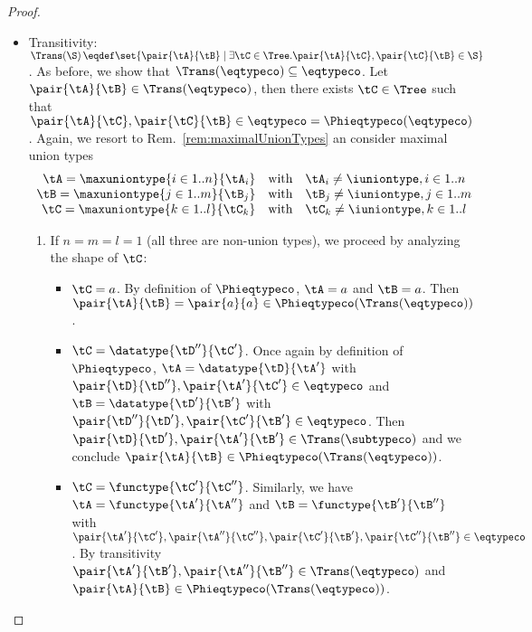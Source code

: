 \begin{proof}
\begin{itemize}
  
  \item Transitivity: $\Trans\!\left(\S\right) \eqdef \set{\pair{\tA}{\tB}
  \mathrel| \exists \tC \in \Tree. \pair{\tA}{\tC}, \pair{\tC}{\tB} \in \S}$.
  As before, we show that $\Trans\!\left(\eqtypeco\right) \subseteq
  \mathbin{\eqtypeco}$. Let $\pair{\tA}{\tB} \in
  \Trans\!\left(\eqtypeco\right)$, then there exists $\tC \in \Tree$ such that
  $\pair{\tA}{\tC}, \pair{\tC}{\tB} \in \mathbin{\eqtypeco} =
  \Phieqtypeco\!\left(\eqtypeco\right)$. Again, we resort to
  Rem.~\ref{rem:maximalUnionTypes} an consider maximal union types $$
\begin{array}{r@{\quad\text{with}\quad}l}
\tA = \maxuniontype{i \in 1..n}{\tA_i} & \tA_i \neq \iuniontype, i \in 1..n \\
\tB = \maxuniontype{j \in 1..m}{\tB_j} & \tB_j \neq \iuniontype, j \in 1..m \\
\tC = \maxuniontype{k \in 1..l}{\tC_k} & \tC_k \neq \iuniontype, k \in 1..l
\end{array} $$
  \begin{enumerate}
    \item If $n = m = l = 1$ (\ie all three are non-union types), we proceed by
    analyzing the shape of $\tC$:
  \begin{itemize}
	  \item $\tC = a$. By definition of $\Phieqtypeco$, $\tA = a$ and $\tB =
	  a$. Then $\pair{\tA}{\tB} = \pair{a}{a} \in
	  \Phieqtypeco\!\left(\Trans(\eqtypeco)\right)$.
	  
	  \item $\tC = \datatype{\tD''}{\tC'}$. Once again by definition of
	  $\Phieqtypeco$, $\tA = \datatype{\tD}{\tA'}$ with $\pair{\tD}{\tD''},
	  \pair{\tA'}{\tC'} \in \mathbin{\eqtypeco}$ and $\tB =
	  \datatype{\tD'}{\tB'}$ with $\pair{\tD''}{\tD'}, \pair{\tC'}{\tB'} \in
	  \mathbin{\eqtypeco}$. Then $\pair{\tD}{\tD'}, \pair{\tA'}{\tB'} \in
	  \Trans\!\left(\subtypeco\right)$ and we conclude $\pair{\tA}{\tB} \in
	  \Phieqtypeco\!\left(\Trans(\eqtypeco)\right)$.
	  
	  \item $\tC = \functype{\tC'}{\tC''}$. Similarly, we have $\tA =
	  \functype{\tA'}{\tA''}$ and $\tB = \functype{\tB'}{\tB''}$ with
	  $\pair{\tA'}{\tC'}, \pair{\tA''}{\tC''}, \pair{\tC'}{\tB'},
	  \pair{\tC''}{\tB''} \in \mathbin{\eqtypeco}$. By transitivity
	  $\pair{\tA'}{\tB'}, \pair{\tA''}{\tB''} \in
	  \Trans\!\left(\eqtypeco\right)$ and $\pair{\tA}{\tB} \in
	  \Phieqtypeco\!\left(\Trans(\eqtypeco)\right)$.
  \end{itemize}
  

\end{enumerate}
\end{itemize}
\end{proof}
